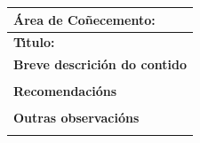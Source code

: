\documentclass[11pt,a4paper]{book}
\theoremstyle{definition}
\theoremstyle{remark}
\begin{document}
\begingroup
\renewcommand*{\arraystretch}{2.2}
\begin{tabular}{|l|}
	\hline
	
	{\bf \'Area de Co\~necemento:  \/ }\\ \hline
	\begin{minipage}{11.5cm}
		{\vspace*{.2cm}
			\bf T\'{\i}tulo:   \/ \bf
			\vspace{.2cm}}
	\end{minipage}\\ \hline
	\bf Breve descrici\'on do contido\\ \hline
	\begin{minipage}{11.5cm}
		{\vspace*{.2cm}

		
		\vspace{.2cm}}
	\end{minipage}\\ \hline
	{\bf Recomendaci\'ons}\\ \hline
	\begin{minipage}{11.5cm}
		{\vspace*{.2cm}


		\vspace{.2cm}}
	\end{minipage}\\ \hline
	{\bf Outras observaci\'ons}\\ \hline
	\begin{minipage}{11.5cm}
		{\vspace*{.2cm}


			\vspace{.2cm}}
	\end{minipage}\\ \hline
\end{tabular}
\endgroup

\clearpage

\thispagestyle{empty}

\tableofcontents

\clearpage

\thispagestyle{empty}

\mbox{}

\clearpage


{}		
\chapter*{}
\end{document}

